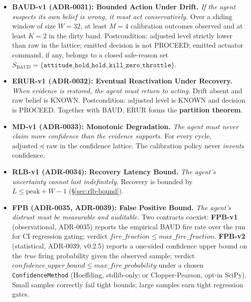 \documentclass[acmsmall,nonacm=true,review=false]{acmart}
\theoremstyle{plain}
\begin{document}
\begin{itemize}
  \item \textbf{BAUD-v1 (ADR-0031): Bounded Action Under Drift.}
        \emph{If the agent suspects its own belief is wrong, it
        must act conservatively.} Over a sliding window of size
        $W=32$, at least $M=4$ calibration outcomes observed and
        at least $K=2$ in the dirty band. Postcondition: adjusted
        level strictly lower than raw in the lattice; emitted
        decision is not PROCEED; emitted actuator command, if
        any, belongs to a closed safe-reason set
        $S_{\mathrm{BAUD}} = \{\texttt{attitude\_hold\_hold}, \texttt{kill\_zero\_throttle}\}$.
  \item \textbf{ERUR-v1 (ADR-0032): Eventual Reactivation Under
        Recovery.} \emph{When evidence is restored, the agent
        must return to acting.} Drift absent and raw belief is
        KNOWN. Postcondition: adjusted level is KNOWN and decision
        is PROCEED. Together with BAUD, ERUR forms the
        \textbf{partition theorem}.
  \item \textbf{MD-v1 (ADR-0033): Monotonic Degradation.}
        \emph{The agent must never claim more confidence than the
        evidence supports.} For every cycle,
        $\mathrm{adjusted} \preceq \mathrm{raw}$ in the confidence
        lattice. The calibration policy never \emph{invents}
        confidence.
  \item \textbf{RLB-v1 (ADR-0034): Recovery Latency Bound.}
        \emph{The agent's uncertainty cannot last indefinitely.}
        Recovery is bounded by $L \le \mathrm{peak} + W - 1$
        (\S\ref{sec:rlb-bound}).
  \item \textbf{FPB (ADR-0035, ADR-0039): False Positive Bound.}
        \emph{The agent's distrust must be measurable and
        auditable.} Two contracts coexist:
        \textbf{FPB-v1} (observational, ADR-0035) reports the
        empirical BAUD fire rate over the run for CI regression
        gating; verdict
        $\mathit{fire\_fraction} \le \mathit{max\_fire\_fraction}$.
        \textbf{FPB-v2} (statistical, ADR-0039, v0.2.5) reports
        a one-sided confidence upper bound on the \emph{true}
        firing probability given the observed sample; verdict
        $\mathit{confidence\_upper\_bound} \le \mathit{max\_fire\_probability}$
        under a chosen \texttt{ConfidenceMethod} (Hoeffding,
        stdlib-only; or Clopper-Pearson, opt-in SciPy).
        Small samples correctly fail tight bounds; large
        samples earn tight regression gates.
\end{itemize}
\end{document}
